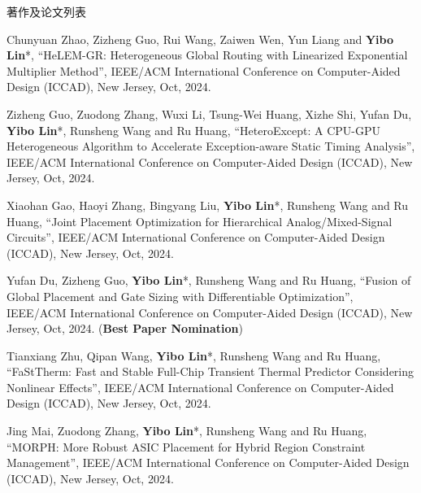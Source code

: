 \begin{rSection}{著作及论文列表}
\begin{description}[font=\normalfont, rightmargin=2em]
{}
            

\item[{[C164]}]{
        Chunyuan Zhao, Zizheng Guo, Rui Wang, Zaiwen Wen, Yun Liang and \textbf{Yibo Lin}*, 
    ``HeLEM-GR: Heterogeneous Global Routing with Linearized Exponential Multiplier Method'', 
    IEEE/ACM International Conference on Computer-Aided Design (ICCAD), New Jersey, Oct, 2024.
    
}
            

\item[{[C163]}]{
        Zizheng Guo, Zuodong Zhang, Wuxi Li, Tsung-Wei Huang, Xizhe Shi, Yufan Du, \textbf{Yibo Lin}*, Runsheng Wang and Ru Huang, 
    ``HeteroExcept: A CPU-GPU Heterogeneous Algorithm to Accelerate Exception-aware Static Timing Analysis'', 
    IEEE/ACM International Conference on Computer-Aided Design (ICCAD), New Jersey, Oct, 2024.
    
}
            

\item[{[C162]}]{
        Xiaohan Gao, Haoyi Zhang, Bingyang Liu, \textbf{Yibo Lin}*, Runsheng Wang and Ru Huang, 
    ``Joint Placement Optimization for Hierarchical Analog/Mixed-Signal Circuits'', 
    IEEE/ACM International Conference on Computer-Aided Design (ICCAD), New Jersey, Oct, 2024.
    
}
            

\item[{[C161]}]{
        Yufan Du, Zizheng Guo, \textbf{Yibo Lin}*, Runsheng Wang and Ru Huang, 
    ``Fusion of Global Placement and Gate Sizing with Differentiable Optimization'', 
    IEEE/ACM International Conference on Computer-Aided Design (ICCAD), New Jersey, Oct, 2024.
    (\textbf{Best Paper Nomination})
}
            

\item[{[C160]}]{
        Tianxiang Zhu, Qipan Wang, \textbf{Yibo Lin}*, Runsheng Wang and Ru Huang, 
    ``FaStTherm: Fast and Stable Full-Chip Transient Thermal Predictor Considering Nonlinear Effects'', 
    IEEE/ACM International Conference on Computer-Aided Design (ICCAD), New Jersey, Oct, 2024.
    
}
            

\item[{[C159]}]{
        Jing Mai, Zuodong Zhang, \textbf{Yibo Lin}*, Runsheng Wang and Ru Huang, 
    ``MORPH: More Robust ASIC Placement for Hybrid Region Constraint Management'', 
    IEEE/ACM International Conference on Computer-Aided Design (ICCAD), New Jersey, Oct, 2024.
    
}
\end{description}
\end{rSection}
